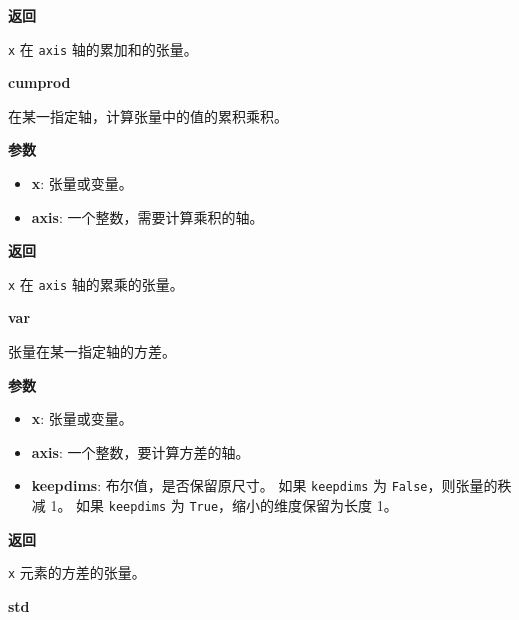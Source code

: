 \textbf{返回}

\texttt{x} 在 \texttt{axis} 轴的累加和的张量。


\textbf{cumprod}\label{cumprod}

\begin{Shaded}
\begin{Highlighting}[]
\OperatorTok{=}\NormalTok{)}
\end{Highlighting}
\end{Shaded}

在某一指定轴，计算张量中的值的累积乘积。

\textbf{参数}

\begin{itemize}
\tightlist
\item
  \textbf{x}: 张量或变量。
\item
  \textbf{axis}: 一个整数，需要计算乘积的轴。
\end{itemize}

\textbf{返回}

\texttt{x} 在 \texttt{axis} 轴的累乘的张量。


\textbf{var}\label{var}

\begin{Shaded}
\begin{Highlighting}[]
\OperatorTok{=}\OperatorTok{=}\NormalTok{)}
\end{Highlighting}
\end{Shaded}

张量在某一指定轴的方差。

\textbf{参数}

\begin{itemize}
\tightlist
\item
  \textbf{x}: 张量或变量。
\item
  \textbf{axis}: 一个整数，要计算方差的轴。
\item
  \textbf{keepdims}: 布尔值，是否保留原尺寸。 如果 \texttt{keepdims} 为
  \texttt{False}，则张量的秩减 1。 如果 \texttt{keepdims} 为
  \texttt{True}，缩小的维度保留为长度 1。
\end{itemize}

\textbf{返回}

\texttt{x} 元素的方差的张量。


\textbf{std}\label{std}

\begin{Shaded}
\begin{Highlighting}[]
\OperatorTok{=}\OperatorTok{=}\NormalTok{)}
\end{Highlighting}
\end{Shaded}

